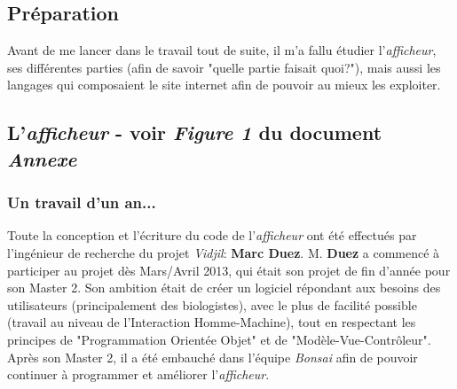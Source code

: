 \documentclass[12pt]{report}
\begin{document}
\begin{spacing}{1.2}
\chapter{Préparation}

Avant de me lancer dans le travail tout de suite, il m'a fallu étudier l'\textit{afficheur}, ses différentes parties (afin de savoir "quelle partie faisait quoi?"), mais aussi les langages qui composaient le site internet afin de pouvoir au mieux les exploiter.

\section{L'\textit{afficheur}  - voir \textit{Figure 1} du document \textit{Annexe}}

\subsection{Un travail d'un an...}
Toute la conception et l'écriture du code de l'\textit{afficheur} ont été effectués par l'ingénieur de recherche du projet \textit{Vidjil}: \textbf{Marc Duez}.
\newline
M. \textbf{Duez} a commencé à participer au projet dès Mars/Avril 2013, qui était son projet de fin d'année pour son Master 2.
\newline
Son ambition était de créer un logiciel répondant aux besoins des utilisateurs (principalement des biologistes), avec le plus de facilité possible (travail au niveau de l'Interaction Homme-Machine), tout en respectant les principes de "Programmation Orientée Objet" et de "Modèle-Vue-Contrôleur".
\newline
Après son Master 2, il a été embauché dans l'équipe \textit{Bonsai} afin de pouvoir continuer à programmer et améliorer l'\textit{afficheur}.


\end{spacing}
\end{document}
